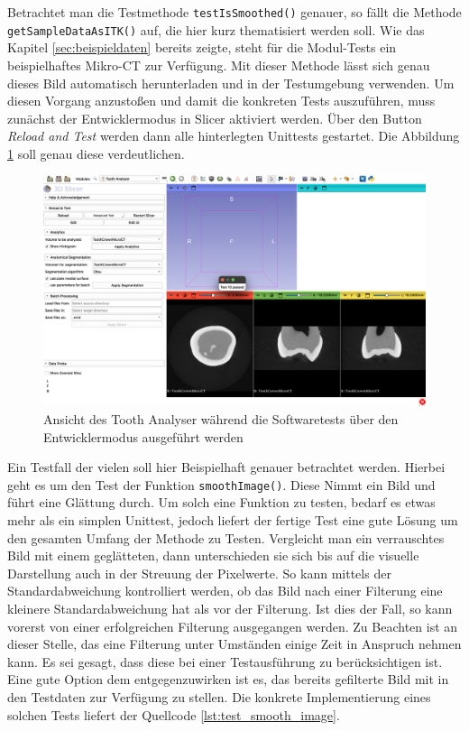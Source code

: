 Betrachtet man die Testmethode \texttt{testIsSmoothed()} genauer, so
fällt die Methode \texttt{getSampleDataAsITK()} auf, die hier kurz
thematisiert werden soll. Wie das Kapitel \ref{sec:beispieldaten} bereits zeigte,
steht für die Modul-Tests ein beispielhaftes Mikro-CT zur Verfügung. Mit dieser
Methode lässt sich genau dieses Bild automatisch herunterladen und in der
Testumgebung verwenden. Um diesen Vorgang anzustoßen und damit die konkreten Tests
auszuführen, muss zunächst der Entwicklermodus in Slicer aktiviert werden. Über den
Button \textit{Reload and Test} werden dann alle hinterlegten Unittests
gestartet. Die Abbildung \ref{fig:tests} soll genau diese verdeutlichen.

\begin{figure}[h]
	\centering
	\includegraphics[width=1\textwidth]{img/toothAnalyser_test.png}
	\caption{Ansicht des Tooth Analyser während die Softwaretests über den Entwicklermodus ausgeführt werden}
	\label{fig:tests}
\end{figure}

Ein Testfall der vielen soll hier Beispielhaft genauer betrachtet werden. Hierbei
geht es um den Test der Funktion \texttt{smoothImage()}. Diese Nimmt ein Bild und
führt eine Glättung durch. Um solch eine Funktion zu testen, bedarf es etwas mehr
als ein simplen Unittest, jedoch liefert der fertige Test eine gute Lösung um
den gesamten Umfang der Methode zu Testen. Vergleicht man ein verrauschtes Bild mit
einem geglätteten, dann unterschieden sie sich bis auf die visuelle Darstellung
auch in der Streuung der Pixelwerte. So kann mittels der Standardabweichung kontrolliert
werden, ob das Bild nach einer Filterung eine kleinere Standardabweichung hat
als vor der Filterung. Ist dies der Fall, so kann vorerst von einer
erfolgreichen Filterung ausgegangen werden. Zu Beachten ist an dieser Stelle,
das eine Filterung unter Umständen einige Zeit in Anspruch nehmen kann. Es sei gesagt,
dass diese bei einer Testausführung zu berücksichtigen ist. Eine gute Option dem
entgegenzuwirken ist es, das bereits gefilterte Bild mit in den Testdaten zur
Verfügung zu stellen. Die konkrete Implementierung eines solchen Tests liefert der
Quellcode \ref{lst:test_smooth_image}.

